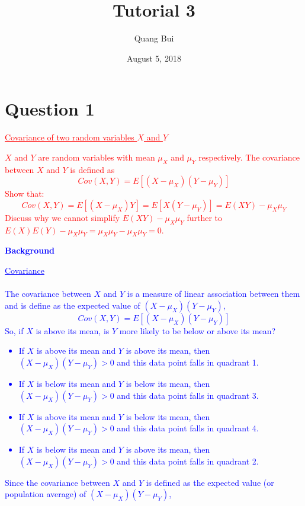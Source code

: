 \documentclass[12pt]{report}
\title{Tutorial 3}
\author{Quang Bui}
\subtitle
{
	\textbf{keywords}: covariance, expected value, diversification, variance, risk, vector, matrix
	
	\textbf{estimated reading time}: 30 minutes
}
\date{August 5, 2018}
\newenvironment{blueframed}[1][blue]
{\def\FrameCommand{\fboxsep=\FrameSep\fcolorbox{#1}{white}}%
\MakeFramed {\advance\hsize-\width \FrameRestore}}
{\endMakeFramed}
\begin{document}
	
\maketitle

\section*{Question 1}
\textcolor{red}{\underline{Covariance of two random variables $X$ and $Y$}}

\noindent \textcolor{red}{$X$ and $Y$ are random variables with mean $\mu_X$ and $\mu_Y$ respectively. The covariance between $X$ and $Y$ is defined as $$Cov(X,Y) = E[(X-\mu_X)(Y-\mu_Y)]$$ Show that: $$Cov(X,Y) = E[(X-\mu_X)Y] = E[X(Y-\mu_Y)] = E(XY) - \mu_X \mu_Y$$ Discuss why we cannot simplify $E(XY) - \mu_X \mu_Y$ further to $E(X)E(Y) - \mu_X \mu_Y = \mu_X \mu_Y - \mu_X \mu_Y = 0$.}

\justify
\begin{blueframed}
	\textcolor{blue}{\textbf{Background}}
	\vspace{-\baselineskip}
	\justify
	\textcolor{blue}{\underline{Covariance} \\ \\ The covariance between $X$ and $Y$ is a measure of linear association between them and is define as the expected value of $(X-\mu_X)(Y-\mu_Y)$, $$Cov(X,Y) = E[(X-\mu_X)(Y-\mu_Y)]$$ So, if $X$ is above its mean, is $Y$ more likely to be below or above its mean? \begin{itemize}
			\item If $X$ is above its mean and $Y$ is above its mean, then $(X-\mu_X)(Y-\mu_Y) > 0$ and this data point falls in quadrant 1.
			\item If $X$ is below its mean and $Y$ is below its mean, then $(X-\mu_X)(Y-\mu_Y) > 0$ and this data point falls in quadrant 3.
			\item If $X$ is above its mean and $Y$ is below its mean, then $(X-\mu_X)(Y-\mu_Y) > 0$ and this data point falls in quadrant 4.
			\item If $X$ is below its mean and $Y$ is above its mean, then $(X-\mu_X)(Y-\mu_Y) > 0$ and this data point falls in quadrant 2.
		\end{itemize} Since the covariance between $X$ and $Y$ is defined as the expected value (or population average) of $(X-\mu_X)(Y-\mu_Y)$,}
\end{blueframed}
\end{document}
